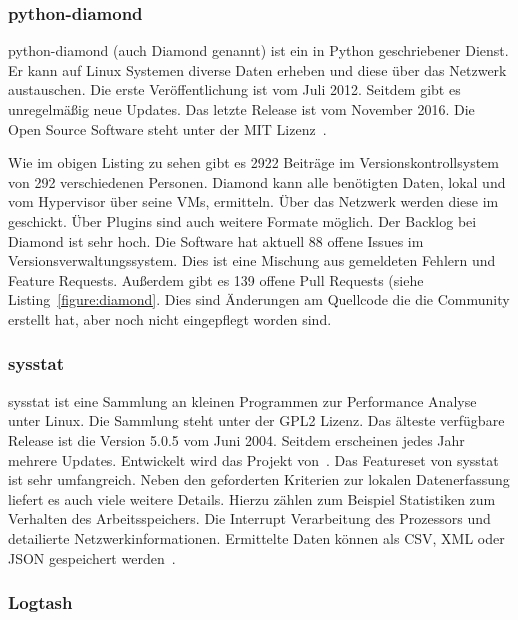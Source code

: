 \subsubsection{python-diamond}
python-diamond (auch Diamond genannt) ist ein in Python geschriebener Dienst.
Er kann auf Linux Systemen diverse Daten erheben und diese über das Netzwerk
austauschen. Die erste Veröffentlichung ist vom Juli 2012. Seitdem gibt es
unregelmäßig neue Updates. Das letzte Release ist vom November 2016. Die Open
Source Software steht unter der MIT Lizenz~\cite{python-diamond}.



Wie im obigen Listing zu sehen gibt es 2922 Beiträge im Versionskontrollsystem
von 292 verschiedenen Personen. Diamond kann alle benötigten Daten, lokal und
vom Hypervisor über seine VMs, ermitteln. Über das Netzwerk werden diese im
 geschickt. Über Plugins sind auch weitere
Formate möglich. Der \gls{Backlog} bei Diamond ist sehr hoch. Die Software hat
aktuell 88 offene Issues im Versionsverwaltungssystem. Dies ist eine Mischung
aus gemeldeten Fehlern und Feature Requests. Außerdem gibt es 139 offene Pull
Requests (siehe Listing~\ref{figure:diamond}. Dies sind Änderungen am
Quellcode die die Community erstellt hat, aber noch nicht eingepflegt worden
sind.
\tm%

\subsubsection{sysstat}
sysstat ist eine Sammlung an kleinen Programmen zur Performance Analyse unter
Linux. Die Sammlung steht unter der GPL2 Lizenz. Das älteste verfügbare Release
ist die Version 5.0.5 vom Juni 2004. Seitdem erscheinen jedes Jahr mehrere
Updates. Entwickelt wird das Projekt von~\cite{systat_releases}. Das Featureset
von sysstat ist sehr umfangreich. Neben den geforderten Kriterien zur lokalen
Datenerfassung liefert es auch viele weitere Details. Hierzu zählen zum
Beispiel Statistiken zum Verhalten des Arbeitsspeichers. Die Interrupt
Verarbeitung des Prozessors und detailierte Netzwerkinformationen. Ermittelte
Daten können als \gls{CSV}, \gls{XML} oder \gls{JSON} gespeichert
werden~\cite{sysstat_features}.
\tm%

\subsubsection{Logtash}
\tm%

